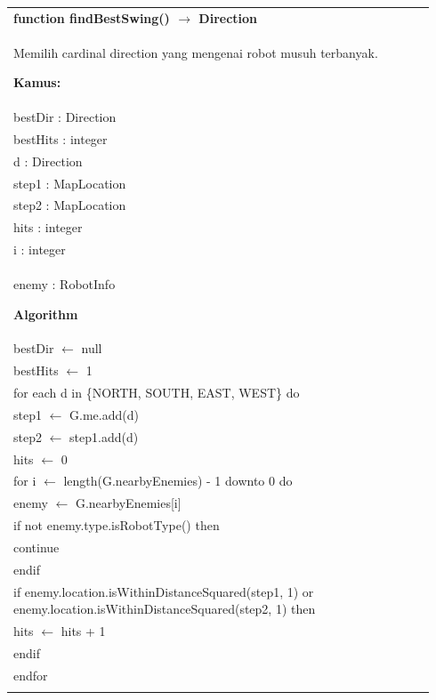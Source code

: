 \documentclass{article}
\newenvironment{pseudobox}
{
\centering
\begin{longtable}{|p{0.94\linewidth}|}
\hline
}
{
\\ \hline
\end{longtable}
\vspace{0.05cm}
}
\begin{document}
\begin{pseudobox}
\textbf{function findBestSwing() $\rightarrow$ Direction} \\
{ Memilih cardinal direction yang mengenai robot musuh terbanyak. }

\textbf{Kamus:} \\
\hspace*{1em} bestDir : Direction \\
\hspace*{1em} bestHits : integer \\
\hspace*{1em} d : Direction \\
\hspace*{1em} step1 : MapLocation \\
\hspace*{1em} step2 : MapLocation \\
\hspace*{1em} hits : integer \\
\hspace*{1em} i : integer \\
\hspace*{1em} enemy : RobotInfo

\textbf{Algorithm} \\
\hspace*{1em} bestDir $\leftarrow$ null \\
\hspace*{1em} bestHits $\leftarrow$ 1 \\

\hspace*{1em} for each d in \{NORTH, SOUTH, EAST, WEST\} do \\
\hspace*{2em} step1 $\leftarrow$ G.me.add(d) \\
\hspace*{2em} step2 $\leftarrow$ step1.add(d) \\
\hspace*{2em} hits $\leftarrow$ 0 \\

\hspace*{2em} for i $\leftarrow$ length(G.nearbyEnemies) - 1 downto 0 do \\
\hspace*{3em} enemy $\leftarrow$ G.nearbyEnemies[i] \\
\hspace*{3em} if not enemy.type.isRobotType() then \\
\hspace*{4em} continue \\
\hspace*{3em} endif \\
\hspace*{3em} if enemy.location.isWithinDistanceSquared(step1, 1) or enemy.location.isWithinDistanceSquared(step2, 1) then \\
\hspace*{4em} hits $\leftarrow$ hits + 1 \\
\hspace*{3em} endif \\
\hspace*{2em} endfor \\


\end{pseudobox}
\end{document}
